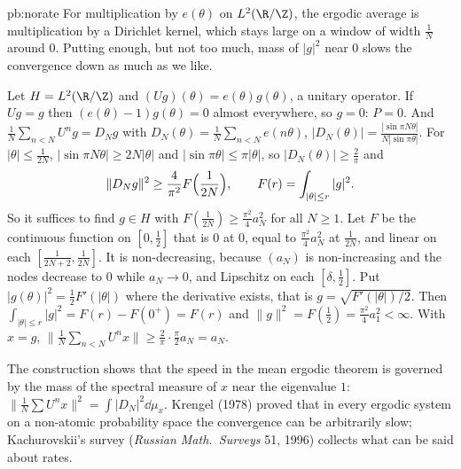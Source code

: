 \begin{solution}{pb:norate}
\idea For multiplication by $e(\theta)$ on $L^2(\R/\Z)$, the ergodic average is multiplication by a Dirichlet kernel, which stays large on a window of width $\frac1N$ around $0$.
Putting enough, but not too much, mass of $|g|^2$ near $0$ slows the convergence down as much as we like.

\writeup Let $H=L^2(\R/\Z)$ and $(Ug)(\theta)=e(\theta)g(\theta)$, a unitary operator. If $Ug=g$ then $(e(\theta)-1)g(\theta)=0$ almost everywhere, so $g=0$: $P=0$. And
$\frac1N\sum_{n<N}U^ng=D_Ng$ with $D_N(\theta)=\frac1N\sum_{n<N}e(n\theta)$, $|D_N(\theta)|=\frac{|\sin\pi N\theta|}{N|\sin\pi\theta|}$. For $|\theta|\le\frac1{2N}$, $|\sin\pi N\theta|\ge2N|\theta|$ and
$|\sin\pi\theta|\le\pi|\theta|$, so $|D_N(\theta)|\ge\frac2\pi$ and
\[
\|D_Ng\|^2\ge\frac4{\pi^2}F\Bigl(\frac1{2N}\Bigr),\qquad F(r)=\int_{|\theta|\le r}|g|^2.
\]
So it suffices to find $g\in H$ with $F(\frac1{2N})\ge\frac{\pi^2}4a_N^2$ for all $N\ge1$. Let $F$ be the continuous function on $[0,\frac12]$ that is $0$ at $0$, equal to $\frac{\pi^2}4a_N^2$ at
$\frac1{2N}$, and linear on each $[\frac1{2N+2},\frac1{2N}]$. It is non-decreasing, because $(a_N)$ is non-increasing and the nodes decrease to $0$ while $a_N\to0$, and Lipschitz on each
$[\delta,\frac12]$. Put $|g(\theta)|^2=\frac12F'(|\theta|)$ where the derivative exists, that is $g=\sqrt{F'(|\theta|)/2}$. Then $\int_{|\theta|\le r}|g|^2=F(r)-F(0^+)=F(r)$ and
$\|g\|^2=F(\frac12)=\frac{\pi^2}4a_1^2<\infty$. With $x=g$, $\|\frac1N\sum_{n<N}U^nx\|\ge\frac2\pi\cdot\frac\pi2a_N=a_N$.

\leads The construction shows that the speed in the mean ergodic theorem is governed by the mass of the spectral measure of $x$ near the eigenvalue $1$:
$\|\frac1N\sum U^nx\|^2=\int|D_N|^2\dd\mu_x$. Krengel (1978) proved that in every ergodic system on a non-atomic probability space the convergence can be arbitrarily slow; Kachurovskii's survey (\emph{Russian Math.\ Surveys} 51, 1996) collects what can be said about rates.
\end{solution}

